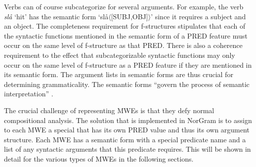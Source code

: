 \documentclass[output=paper]{langsci/langscibook}
\begin{document}
Verbs can of course subcategorize for several arguments.
For example, the verb \textit{slå} `hit' has the semantic form `slå$\langle$[SUBJ,OBJ]$\rangle$' since it requires a subject and an object.
The completeness requirement for f-structures stipulates that each of the syntactic functions mentioned in the semantic form of a PRED feature must occur on the same level of f-structure as that PRED.
There is also a coherence requirement to the effect that subcategorizable syntactic functions may only occur on the same level of f-structure as a PRED feature if they are mentioned in its semantic form.
The argument lists in semantic forms are thus crucial for determining grammaticality.
The semantic forms ``govern the process of semantic interpretation” \citep[177]{kaplanbresnan82}.

The crucial challenge of representing MWEs is that they defy normal compositional analysis.
The  solution that is implemented in NorGram is to assign to each MWE a special  that has its own PRED value and thus its own argument structure.
Each MWE has a semantic form with a special predicate name and a list of any syntactic arguments that this predicate requires.
This will be shown in detail for the various types of MWEs in the following sections.

%
%


\end{document}
